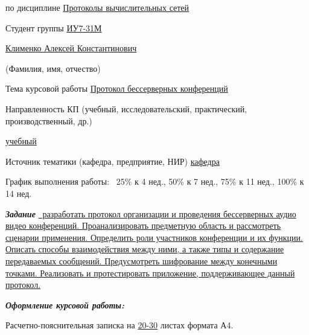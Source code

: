 \documentclass{bmstu}
\begin{document}
\begin{flushleft}
	\fontsize{12pt}{0.6cm}\selectfont
	
	по дисциплине \uline{\hfill Протоколы вычислительных сетей \hfill}
	
	Студент группы \uline{ИУ7-31М}
	
	\centerline{\uline{\hfill Клименко Алексей Константинович \hfill}}
	\scriptsize\mbox{\hspace{7cm}}(Фамилия, имя, отчество)
	
	\fontsize{12pt}{0.6cm}\selectfont
	
	\fontsize{12pt}{0.5\baselineskip}\selectfont
	Тема курсовой работы {\uline{\hfill Протокол бессерверных конференций \hfill}}
	
	Направленность КП (учебный, исследовательский, практический, производственный, др.)\hfill\centerline{\uline{\hfill учебный \hfill}}
	
	Источник тематики (кафедра, предприятие, НИР) {\uline{\hfill кафедра \hfill}}
	
	\fontsize{12pt}{0.6\baselineskip}\selectfont
	График выполнения работы: ~25\% к 4 нед., 50\% к 7 нед., 75\% к 11 нед., 100\% к 14 нед.
	
	\addvspace{8pt}
	\fontsize{12pt}{0.5\baselineskip}\selectfont
	\textit{\bfseries{Задание}} 
	\uline{~разработать протокол организации и проведения бессерверных аудио видео конференций. Проанализировать предметную область и рассмотреть сценарии применения. Определить роли участников конференции и их функции. Описать способы взаимодействия между ними, а также типы и содержание передаваемых сообщений. Предусмотреть шифрование между конечными точками. Реализовать и протестировать приложение, поддерживающее данный протокол.
	\hfill}
	
	\addvspace{6pt}
	
	\textit{\bfseries{Оформление курсовой работы:}}
	
	\fontsize{12pt}{0.1cm}\selectfont
	Расчетно-пояснительная записка на \uline{20-30} листах формата А4.
\end{flushleft}

\vfill
\end{document}
